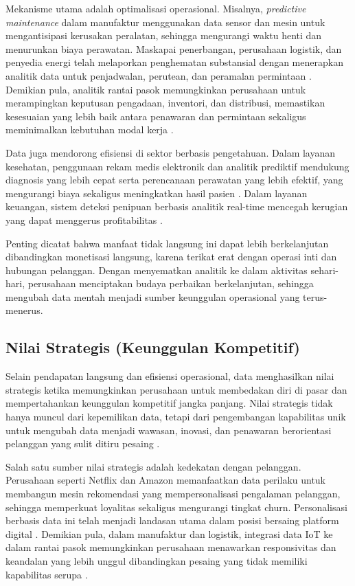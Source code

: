 Mekanisme utama adalah optimalisasi operasional. Misalnya, \textit{predictive maintenance} dalam manufaktur menggunakan data sensor dan mesin untuk mengantisipasi kerusakan peralatan, sehingga mengurangi waktu henti dan menurunkan biaya perawatan. Maskapai penerbangan, perusahaan logistik, dan penyedia energi telah melaporkan penghematan substansial dengan menerapkan analitik data untuk penjadwalan, perutean, dan peramalan permintaan \cite{lee2013predictive, chong2017predictive}. Demikian pula, analitik rantai pasok memungkinkan perusahaan untuk merampingkan keputusan pengadaan, inventori, dan distribusi, memastikan kesesuaian yang lebih baik antara penawaran dan permintaan sekaligus meminimalkan kebutuhan modal kerja \cite{waller2015data}.

Data juga mendorong efisiensi di sektor berbasis pengetahuan. Dalam layanan kesehatan, penggunaan rekam medis elektronik dan analitik prediktif mendukung diagnosis yang lebih cepat serta perencanaan perawatan yang lebih efektif, yang mengurangi biaya sekaligus meningkatkan hasil pasien \cite{bates2014bigdata}. Dalam layanan keuangan, sistem deteksi penipuan berbasis analitik real-time mencegah kerugian yang dapat menggerus profitabilitas \cite{phua2010comprehensive}.

Penting dicatat bahwa manfaat tidak langsung ini dapat lebih berkelanjutan dibandingkan monetisasi langsung, karena terikat erat dengan operasi inti dan hubungan pelanggan. Dengan menyematkan analitik ke dalam aktivitas sehari-hari, perusahaan menciptakan budaya perbaikan berkelanjutan, sehingga mengubah data mentah menjadi sumber keunggulan operasional yang terus-menerus.

\subsection{Nilai Strategis (Keunggulan Kompetitif)}

Selain pendapatan langsung dan efisiensi operasional, data menghasilkan nilai strategis ketika memungkinkan perusahaan untuk membedakan diri di pasar dan mempertahankan keunggulan kompetitif jangka panjang. Nilai strategis tidak hanya muncul dari kepemilikan data, tetapi dari pengembangan kapabilitas unik untuk mengubah data menjadi wawasan, inovasi, dan penawaran berorientasi pelanggan yang sulit ditiru pesaing \cite{barney1991firm}.

Salah satu sumber nilai strategis adalah kedekatan dengan pelanggan. Perusahaan seperti Netflix dan Amazon memanfaatkan data perilaku untuk membangun mesin rekomendasi yang mempersonalisasi pengalaman pelanggan, sehingga memperkuat loyalitas sekaligus mengurangi tingkat churn. Personalisasi berbasis data ini telah menjadi landasan utama dalam posisi bersaing platform digital \cite{gomez2016netflix, hofmann2017recommender}. Demikian pula, dalam manufaktur dan logistik, integrasi data IoT ke dalam rantai pasok memungkinkan perusahaan menawarkan responsivitas dan keandalan yang lebih unggul dibandingkan pesaing yang tidak memiliki kapabilitas serupa \cite{porter2014iot}.

